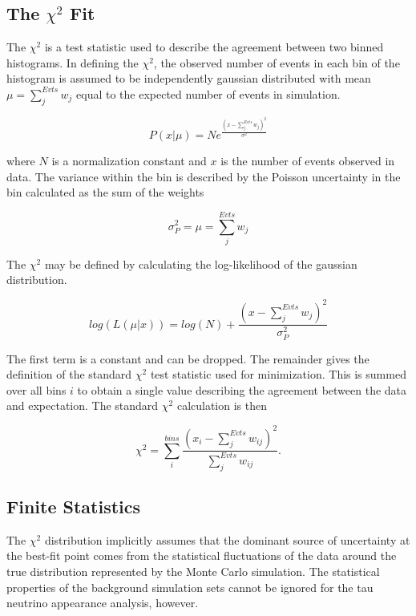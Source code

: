 \label{subsec:chi2}
\subsection{The $\chi^2$ Fit}
The $\chi^2$ is a test statistic used to describe the agreement between two binned histograms.
In defining the $\chi^2$, the observed number of events in each bin of the histogram is assumed to be independently gaussian distributed with mean $\mu=\sum_j^{Evts}w_j$ equal to the expected number of events in simulation.

\begin{equation}
	P\left(x|\mu\right) = N e^{\frac{\left(x-\sum_j^{Evts}w_j\right)^2}{\sigma^2}}
\end{equation}

where $N$ is a normalization constant and $x$ is the number of events observed in data.
The variance within the bin is described by the Poisson uncertainty in the bin calculated as the sum of the weights 

\begin{equation}
\label{eqn:sigma_nomc}
	\sigma^2_P = \mu = \sum_j^{Evts}w_j
\end{equation}

The $\chi^2$ may be defined by calculating the log-likelihood of the gaussian distribution.

\begin{equation}
	log\left(L\left(\mu | x\right)\right) = log\left(N\right) + \frac{\left(x-\sum_j^{Evts}w_j\right)^2}{\sigma^2_P}
\end{equation}

The first term is a constant and can be dropped. 
The remainder gives the definition of the standard $\chi^2$ test statistic used for minimization.
This is summed over all bins $i$ to obtain a single value describing the agreement between the data and expectation.
The standard $\chi^2$ calculation is then

\begin{equation}
	\chi^2 = \sum^{bins}_i \frac{\left(x_i-\sum_j^{Evts}w_{ij}\right)^2}{\sum_j^{Evts}w_{ij}} .
\end{equation}

\label{subsec:finite_stats}
\subsection{Finite Statistics}
The $\chi^2$ distribution implicitly assumes that the dominant source of uncertainty at the best-fit point comes from the statistical fluctuations of the data around the true distribution represented by the Monte Carlo simulation.
The statistical properties of the background simulation sets cannot be ignored for the tau neutrino appearance analysis, however.

